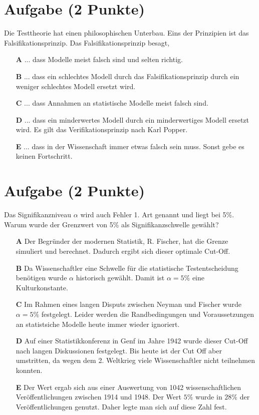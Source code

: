 \documentclass[a4paper, 9pt]{scrartcl}\usepackage[]{graphicx}\usepackage[]{xcolor}
\begin{document}
\section{Aufgabe \hfill (2 Punkte)}



Die Testtheorie hat einen philosophischen Unterbau. Eins der Prinzipien ist das Falsifikationsprinzip. Das Falsifikationsprinzip besagt,



\begin{enumerate}
\item [\textbf{A} \msquare] ... dass Modelle meist falsch sind und selten richtig.
\item [\textbf{B} \msquare] ... dass ein schlechtes Modell durch das Falsifikationsprinzip durch ein weniger schlechtes Modell ersetzt wird.
\item [\textbf{C} \msquare] ... dass Annahmen an statistische Modelle meist falsch sind.
\item [\textbf{D} \msquare] ... dass ein minderwertes Modell durch ein minderwertiges Modell ersetzt wird. Es gilt das Verifikationsprinzip nach Karl Popper.
\item [\textbf{E} \msquare] ... dass in der Wissenschaft immer etwas falsch sein muss. Sonst gebe es keinen Fortschritt.
\end{enumerate}

\section{Aufgabe \hfill (2 Punkte)}



Das Signifikanzniveau $\alpha$ wird auch Fehler 1. Art genannt und liegt bei 5\%. Warum wurde der Grenzwert von 5\% als Signifikanzschwelle gewählt?



\begin{enumerate}
\item [\textbf{A} \msquare] Der Begründer der modernen Statistik, R. Fischer, hat die Grenze simuliert und berechnet. Dadurch ergibt sich dieser optimale Cut-Off.
\item [\textbf{B} \msquare] Da Wissenschaftler eine Schwelle für die statistische Testentscheidung benötigen wurde $\alpha$ historisch gewählt. Damit ist $\alpha = 5\%$ eine Kulturkonstante.
\item [\textbf{C} \msquare] Im Rahmen eines langen Disputs zwischen Neyman und Fischer wurde $\alpha = 5\%$ festgelegt. Leider werden die Randbedingungen und Voraussetzungen an statistsiche Modelle heute immer wieder ignoriert.
\item [\textbf{D} \msquare] Auf einer Statistikkonferenz in Genf im Jahre 1942 wurde dieser Cut-Off nach langen Diskussionen festgelegt. Bis heute ist der Cut Off aber umstritten, da wegen dem 2. Weltkrieg viele Wissenschaftler nicht teilnehmen konnten.
\item [\textbf{E} \msquare] Der Wert ergab sich aus einer Auswertung von 1042 wissenschaftlichen Veröffentlichungen zwischen 1914 und 1948. Der Wert $5\%$ wurde in $28\%$ der Veröffentlichungen genutzt. Daher legte man sich auf diese Zahl fest.
\end{enumerate}
\end{document}
